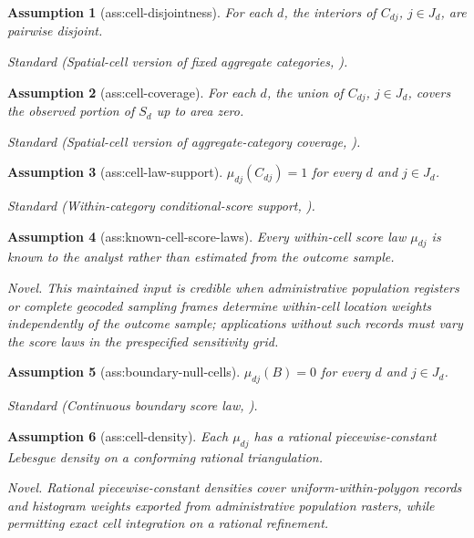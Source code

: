 \documentclass{article}
\newtheorem{assumption}{Assumption}
\begin{document}
\begin{assumption}[ass:cell-disjointness]\label{ass:cell-disjointness}
For each \(d\), the interiors of \(C_{dj}\), \(j\in J_d\), are pairwise disjoint.
\par\smallskip\noindent\emph{Standard} (Spatial-cell version of fixed aggregate categories, \cite{Moon2024AggregatePartialID}).
\end{assumption}

\begin{assumption}[ass:cell-coverage]\label{ass:cell-coverage}
For each \(d\), the union of \(C_{dj}\), \(j\in J_d\), covers the observed portion of \(S_d\) up to area zero.
\par\smallskip\noindent\emph{Standard} (Spatial-cell version of aggregate-category coverage, \cite{Moon2024AggregatePartialID}).
\end{assumption}

\begin{assumption}[ass:cell-law-support]\label{ass:cell-law-support}
\(\mu_{dj}(C_{dj})=1\) for every \(d\) and \(j\in J_d\).
\par\smallskip\noindent\emph{Standard} (Within-category conditional-score support, \cite{Moon2024AggregatePartialID}).
\end{assumption}

\begin{assumption}[ass:known-cell-score-laws]\label{ass:known-cell-score-laws}
Every within-cell score law \(\mu_{dj}\) is known to the analyst rather than estimated from the outcome sample.
\par\smallskip\noindent\emph{Novel.} This maintained input is credible when administrative population registers or complete geocoded sampling frames determine within-cell location weights independently of the outcome sample; applications without such records must vary the score laws in the prespecified sensitivity grid.
\end{assumption}

\begin{assumption}[ass:boundary-null-cells]\label{ass:boundary-null-cells}
\(\mu_{dj}(B)=0\) for every \(d\) and \(j\in J_d\).
\par\smallskip\noindent\emph{Standard} (Continuous boundary score law, \cite{CattaneoTitiunikYu2025LocationBoundary}).
\end{assumption}

\begin{assumption}[ass:cell-density]\label{ass:cell-density}
Each \(\mu_{dj}\) has a rational piecewise-constant Lebesgue density on a conforming rational triangulation.
\par\smallskip\noindent\emph{Novel.} Rational piecewise-constant densities cover uniform-within-polygon records and histogram weights exported from administrative population rasters, while permitting exact cell integration on a rational refinement.
\end{assumption}
\end{document}
